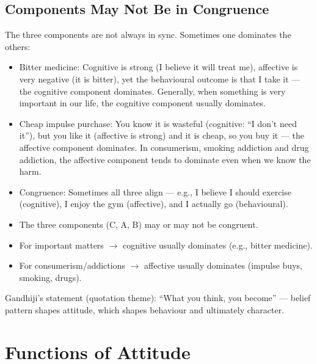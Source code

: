\subsection{Components May Not Be in Congruence}

The three components are not always in sync. Sometimes one dominates the others:

\begin{itemize}
\item Bitter medicine: Cognitive is strong (I believe it will treat me), affective is very negative (it is bitter), yet the behavioural outcome is that I take it --- the cognitive component dominates. Generally, when something is very important in our life, the cognitive component usually dominates.
\item Cheap impulse purchase: You know it is wasteful (cognitive: ``I don't need it''), but you like it (affective is strong) and it is cheap, so you buy it --- the affective component dominates. In consumerism, smoking addiction and drug addiction, the affective component tends to dominate even when we know the harm.
\item Congruence: Sometimes all three align --- e.g., I believe I should exercise (cognitive), I enjoy the gym (affective), and I actually go (behavioural).
\end{itemize}

\begin{CriticalPoint}
\begin{itemize}
\item The three components (C, A, B) may or may not be congruent.
\item For important matters $\rightarrow$ cognitive usually dominates (e.g., bitter medicine).
\item For consumerism/addictions $\rightarrow$ affective usually dominates (impulse buys, smoking, drugs).
\end{itemize}
\end{CriticalPoint}

\begin{PYQLink}
Gandhiji's statement (quotation theme): ``What you think, you become'' --- belief pattern shapes attitude, which shapes behaviour and ultimately character.
\end{PYQLink}

\section{Functions of Attitude}

